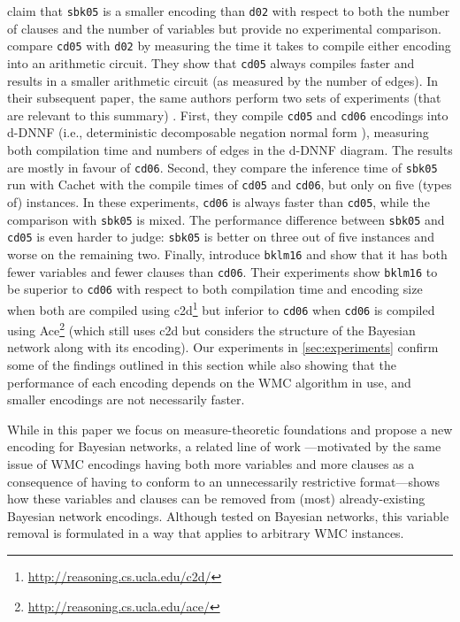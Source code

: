 \documentclass[accepted]{uai2021}
\theoremstyle{definition}
\begin{document}
\citet{DBLP:conf/aaai/SangBK05} claim that
\texttt{sbk05} is a smaller encoding than \texttt{d02} with respect to both the
number of clauses and the number of variables but provide no experimental
comparison. \citet{DBLP:conf/ijcai/ChaviraD05} compare \texttt{cd05} with
\texttt{d02} by measuring the time it takes to compile either encoding into an
arithmetic circuit. They show that
\texttt{cd05} always compiles faster and results in a smaller arithmetic circuit
(as measured by the number of edges). In their subsequent paper, the same
authors perform two sets of experiments (that are relevant to this summary)
\citep{DBLP:conf/sat/ChaviraD06}. First, they compile \texttt{cd05} and
\texttt{cd06} encodings into d-DNNF (i.e., deterministic decomposable negation
normal form \citep{DBLP:journals/jancl/Darwiche01}), measuring both compilation
time and numbers of edges in the d-DNNF diagram. The results are mostly in
favour of \texttt{cd06}. Second, they compare the inference time of
\texttt{sbk05} run with \textsf{Cachet} \citep{DBLP:conf/sat/SangBBKP04} with
the compile times of \texttt{cd05} and \texttt{cd06}, but only on five (types
of) instances. In these experiments, \texttt{cd06} is always faster than
\texttt{cd05}, while the comparison with \texttt{sbk05} is mixed.  The
performance difference between \texttt{sbk05} and \texttt{cd05} is even harder
to judge: \texttt{sbk05} is better on three out of five instances and worse on
the remaining two. Finally, \citet{DBLP:conf/ecai/BartKLM16} introduce
\texttt{bklm16} and show that it has both fewer variables and fewer clauses than
\texttt{cd06}. Their experiments show \texttt{bklm16} to be superior to
\texttt{cd06} with respect to both compilation time and encoding size when both
are compiled using
\textsf{c2d}\footnote{\url{http://reasoning.cs.ucla.edu/c2d/}}
\citep{DBLP:conf/ecai/Darwiche04} but inferior to \texttt{cd06} when
\texttt{cd06} is compiled using
\textsf{Ace}\footnote{\url{http://reasoning.cs.ucla.edu/ace/}} (which still uses
\textsf{c2d} but considers the structure of the Bayesian network along with its
encoding). Our experiments in \cref{sec:experiments} confirm some of the
findings outlined in this section while also showing that the performance of
each encoding depends on the WMC algorithm in use, and smaller encodings are not
necessarily faster.

While in this paper we focus on measure-theoretic foundations and propose a
new encoding for Bayesian networks, a related line of work
\citep{my_sat_paper}---motivated by the same issue of WMC encodings having both
more variables and more clauses as a consequence of having to conform to an
unnecessarily restrictive format---shows how these variables and clauses can be
removed from (most) already-existing Bayesian network encodings. Although tested
on Bayesian networks, this variable removal is formulated in a way that applies
to arbitrary WMC instances.
\end{document}
